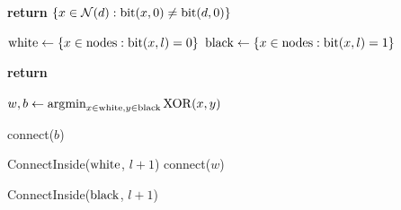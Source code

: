 \documentclass[conference]{IEEEtran}
\theoremstyle{definition}
\DeclareMathOperator*{\argmin}{\arg\!\min}
\newcommand{\cN}{{\mathcal{N}}}
\begin{document}
\begin{algorithm}
    \begin{algorithmic}[1]

           
            \State \textbf{return} $ \{x \in \cN(d): {\rm bit}(x, 0) 
            		\ne {\rm bit}(d, 0)\} $
        \EndFunction

    \end{algorithmic}
\end{algorithm}

\begin{algorithm}
    \begin{algorithmic}[1]

            \State ${\rm white} \gets \{x \in {\rm nodes}: {\rm bit}(x, l) = 0\}$
            \State ${\rm black} \gets \{x \in {\rm nodes}: {\rm bit}(x, l) = 1\}$
            
                \State \textbf{return}
            \EndIf

            \State $w,b \gets \argmin_{x \in {\rm white}, y \in {\rm black}}{\rm XOR}(x, y)$

                    \State connect($b$)
                \EndIf
                
                \State ConnectInside(${\rm white}$, $l + 1$)
            \Else
                    \State connect($w$)
                \EndIf

                \State ConnectInside(${\rm black}$, $l + 1$)
            \EndIf
        \EndProcedure
        
    \end{algorithmic}
\end{algorithm}
\end{document}
